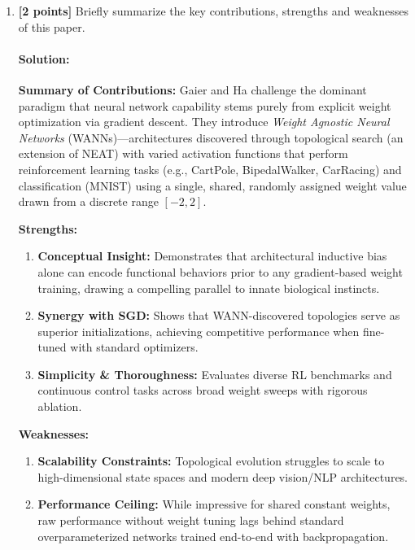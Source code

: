 \documentclass[11pt,english]{article}
\begin{document}
\begin{enumerate}[resume]
\item
\textbf{[2 points]}
Briefly summarize the key contributions, strengths and weaknesses of this paper.

\paragraph{Solution:}

\textbf{Summary of Contributions:} 
Gaier and Ha challenge the dominant paradigm that neural network capability stems purely from explicit weight optimization via gradient descent. They introduce \emph{Weight Agnostic Neural Networks} (WANNs)—architectures discovered through topological search (an extension of NEAT) with varied activation functions that perform reinforcement learning tasks (e.g., CartPole, BipedalWalker, CarRacing) and classification (MNIST) using a single, shared, randomly assigned weight value drawn from a discrete range $[-2, 2]$.

\textbf{Strengths:}
\begin{enumerate}[leftmargin=*]
    \item \textbf{Conceptual Insight:} Demonstrates that architectural inductive bias alone can encode functional behaviors prior to any gradient-based weight training, drawing a compelling parallel to innate biological instincts.
    \item \textbf{Synergy with SGD:} Shows that WANN-discovered topologies serve as superior initializations, achieving competitive performance when fine-tuned with standard optimizers.
    \item \textbf{Simplicity \& Thoroughness:} Evaluates diverse RL benchmarks and continuous control tasks across broad weight sweeps with rigorous ablation.
\end{enumerate}

\textbf{Weaknesses:}
\begin{enumerate}[leftmargin=*]
    \item \textbf{Scalability Constraints:} Topological evolution struggles to scale to high-dimensional state spaces and modern deep vision/NLP architectures.
    \item \textbf{Performance Ceiling:} While impressive for shared constant weights, raw performance without weight tuning lags behind standard overparameterized networks trained end-to-end with backpropagation.
\end{enumerate}


\end{enumerate}
\end{document}
